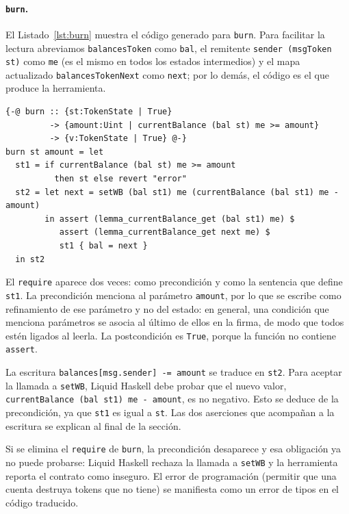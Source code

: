 \paragraph{\lstinline|burn|.} El Listado~\ref{lst:burn} muestra el código generado
para \lstinline|burn|. Para facilitar la lectura abreviamos \lstinline|balancesToken|
como \lstinline|bal|, el remitente \lstinline|sender (msgToken st)| como
\lstinline|me| (es el mismo en todos los estados intermedios) y el mapa actualizado
\lstinline|balancesTokenNext| como \lstinline|next|; por lo demás, el código es el que
produce la herramienta.

\begin{lstlisting}[language=LHaskell, caption={Traducción de \lstinline|burn|.}, label={lst:burn}]
{-@ burn :: {st:TokenState | True}
         -> {amount:Uint | currentBalance (bal st) me >= amount}
         -> {v:TokenState | True} @-}
burn st amount = let
  st1 = if currentBalance (bal st) me >= amount
          then st else revert "error"
  st2 = let next = setWB (bal st1) me (currentBalance (bal st1) me - amount)
        in assert (lemma_currentBalance_get (bal st1) me) $
           assert (lemma_currentBalance_get next me) $
           st1 { bal = next }
  in st2
\end{lstlisting}

El \lstinline|require| aparece dos veces: como precondición y como la sentencia que
define \lstinline|st1|. La precondición menciona al parámetro \lstinline|amount|, por
lo que se escribe como refinamiento de ese parámetro y no del estado: en general, una
condición que menciona parámetros se asocia al último de ellos en la firma, de modo
que todos estén ligados al leerla. La postcondición es \lstinline|True|, porque la
función no contiene \lstinline|assert|.

La escritura \lstinline|balances[msg.sender] -= amount| se traduce en
\lstinline|st2|. Para aceptar la llamada a \lstinline|setWB|, Liquid Haskell debe
probar que el nuevo valor, \lstinline|currentBalance (bal st1) me - amount|, es no
negativo. Esto se deduce de la precondición, ya que \lstinline|st1| es igual a
\lstinline|st|. Las dos aserciones que acompañan a la escritura se explican al final
de la sección.

Si se elimina el \lstinline|require| de \lstinline|burn|, la precondición desaparece y
esa obligación ya no puede probarse: Liquid Haskell rechaza la llamada a
\lstinline|setWB| y la herramienta reporta el contrato como inseguro. El error de
programación (permitir que una cuenta destruya tokens que no tiene) se manifiesta
como un error de tipos en el código traducido.

